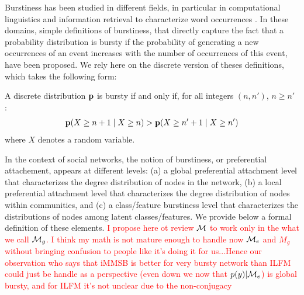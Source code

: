 Burstiness has been studied in different fields, in particular in computational linguistics and information retrieval to characterize word occurrences \cite{church1995poisson}. In these domains, simple definitions of burstiness, that directly capture the fact that a probability distribution is bursty if the probability of generating a new occurrences of an event increases with the number of occurrences of this event, have been proposed\cite{clinchant2008bnb,clinchant2010information}. We rely here on the discrete version of theses definitions, which takes the following form:
%
\begin{definition}[Burstiness]
	A discrete distribution $\mathbf{p}$ is bursty if and only if, for all integers $(n, n')$, $n \geq n'$ :
	\begin{equation}
	\mathbf{p}(X \geq n+1 \mid X \geq n) > \mathbf{p}(X \geq n'+1 \mid X \geq n') \nonumber
	\end{equation}
	where $X$ denotes a random variable.
\label{def:burst}
\end{definition}
%
In the context of social networks, the notion of burstiness, or preferential attachement, appears at different levels: (a) a global preferential attachment level that characterizes the degree distribution of nodes in the network, (b) a local preferential attachment level that characterizes the degree distribution of nodes within communities, and (c) a class/feature burstiness level that characterizes the distributions of nodes among latent classes/features. We provide below a formal definition of these elements.
%
\textcolor{red}{I propose here ot review $\mathcal{M}$ to work only in the what we call $\mathcal{M}_g$. I think my math is not mature enough to handle now $\mathcal{M}_e$ and $M_g$ without bringing confusion to people like it's doing it for us...Hence our observation who says that iMMSB is better for very bursty network than ILFM could just be handle as a perspective (even down we now that $p(y)| \mathcal{M}_e$) is global bursty, and for ILFM it's not unclear due to the non-conjugacy}
